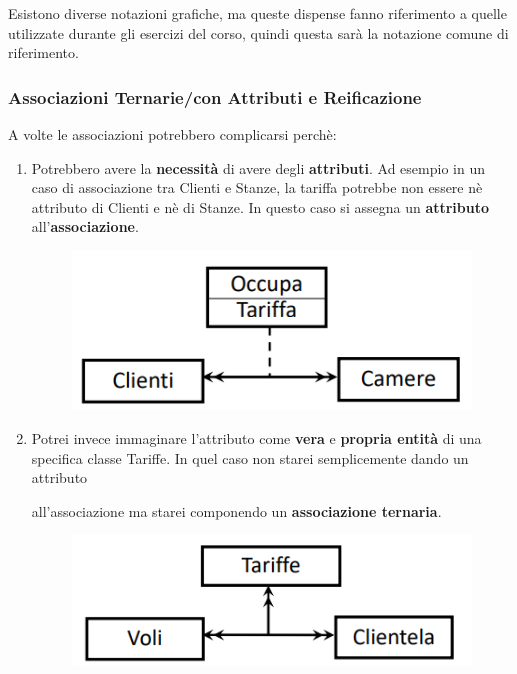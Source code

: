 \documentclass{article}
\begin{document}
Esistono diverse notazioni grafiche, ma queste dispense fanno riferimento a quelle utilizzate durante gli esercizi del corso, quindi questa sarà la notazione comune di riferimento.

\newpage

\subsubsection{Associazioni Ternarie/con Attributi e Reificazione}

A volte le associazioni potrebbero complicarsi perchè:

\begin{enumerate}
    \item Potrebbero avere la \textbf{necessità} di avere degli \textbf{attributi}. Ad esempio in un caso di associazione tra Clienti e Stanze, la tariffa potrebbe non essere
    nè attributo di Clienti e nè di Stanze. In questo caso si assegna un \textbf{attributo} all'\textbf{associazione}.

    \begin{figure}[htbp]
        \center
        \includegraphics[scale=0.55]{img/associazioneAttributo.png}
    \end{figure}

    \item Potrei invece immaginare l'attributo come \textbf{vera} e \textbf{propria entità} di una specifica classe Tariffe. In quel caso non starei semplicemente dando 
    un attributo 

    
    all'associazione ma starei componendo un \textbf{associazione ternaria}.
    \begin{figure}[htbp]
        \center
        \includegraphics[scale=0.55]{img/associazioneTernaria.png}
    \end{figure}

\end{enumerate}
\end{document}
